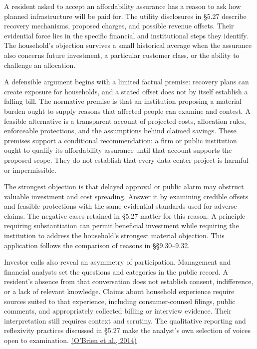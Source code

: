 \noindent \noindent A resident asked to accept an affordability assurance has a
reason to ask how planned infrastructure will be paid for. The utility
disclosures in §5.27 describe recovery mechanisms, proposed charges, and
possible revenue offsets. Their evidential force lies in the specific
financial and institutional steps they identify. The household's
objection survives a small historical average when the assurance also
concerns future investment, a particular customer class, or the ability
to challenge an allocation.

A defensible argument begins with a limited factual premise: recovery
plans can create exposure for households, and a stated offset does not
by itself establish a falling bill. The normative premise is that an
institution proposing a material burden ought to supply reasons that
affected people can examine and contest. A feasible alternative is a
transparent account of projected costs, allocation rules, enforceable
protections, and the assumptions behind claimed savings. These premises
support a conditional recommendation: a firm or public institution ought
to qualify its affordability assurance until that account supports the
proposed scope. They do not establish that every data-center project is
harmful or impermissible.

The strongest objection is that delayed approval or public alarm may
obstruct valuable investment and cost spreading. Answer it by examining
credible offsets and feasible protections with the same evidential
standards used for adverse claims. The negative cases retained in §5.27
matter for this reason. A principle requiring substantiation can permit
beneficial investment while requiring the institution to address the
household's strongest material objection. This application follows the
comparison of reasons in §§9.30--9.32.

Investor calls also reveal an asymmetry of participation. Management and
financial analysts set the questions and categories in the public
record. A resident's absence from that conversation does not establish
consent, indifference, or a lack of relevant knowledge. Claims about
household experience require sources suited to that experience,
including consumer-counsel filings, public comments, and appropriately
collected billing or interview evidence. Their interpretation still
requires context and scrutiny. The qualitative reporting and reflexivity
practices discussed in §5.27 make the analyst's own selection of voices
open to examination.
\href{https://doi.org/10.1097/ACM.0000000000000388}{(O'Brien et al.,
2014)}

